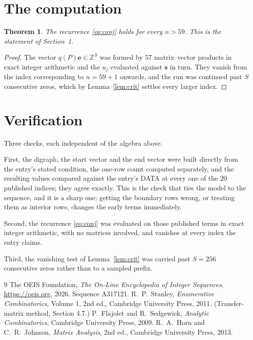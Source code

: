 \documentclass[11pt,a4paper]{article}
\theoremstyle{plain}
\newtheorem{theorem}{Theorem}
\theoremstyle{definition}
\begin{document}
\section{The computation}

\begin{theorem}
The recurrence \eqref{eq:conj} holds for every $n>59$. This is the statement of
Section~1.
\end{theorem}

\begin{proof}
The vector $q(P)\mathbf{e}\in\mathbb{Z}^{S}$ was formed by $57$ matrix--vector
products in exact integer arithmetic and the $u_j$ evaluated against $\mathbf{s}$ in turn.
They vanish from the index corresponding to $n=59+1$ onwards, and the run was continued
past $S$ consecutive zeros, which by Lemma~\ref{lem:crit} settles every larger index.
\end{proof}

\section{Verification}

Three checks, each independent of the algebra above.

First, the digraph, the start vector and the end vector were built directly from the
entry's stated condition, the one-row count computed separately, and the resulting values
compared against the entry's DATA at every one of the $20$ published indices; they
agree exactly. This is the check that ties the model to the sequence, and it is a sharp one:
getting the boundary rows wrong, or treating them as interior rows, changes the early terms
immediately.

Second, the recurrence \eqref{eq:conj} was evaluated on those published terms in exact
integer arithmetic, with no matrices involved, and vanishes at every index the entry claims.

Third, the vanishing test of Lemma~\ref{lem:crit} was carried past $S=256$ consecutive
zeros rather than to a sampled prefix.

\begin{thebibliography}{9}
 The OEIS Foundation, \emph{The On-Line Encyclopedia of Integer
Sequences}, \url{https://oeis.org}, 2026. Sequence A317121.
 R.~P.~Stanley, \emph{Enumerative Combinatorics}, Volume 1, 2nd ed.,
Cambridge University Press, 2011. (Transfer-matrix method, Section 4.7.)
 P.~Flajolet and R.~Sedgewick, \emph{Analytic Combinatorics}, Cambridge
University Press, 2009.
 R.~A.~Horn and C.~R.~Johnson, \emph{Matrix Analysis}, 2nd ed., Cambridge
University Press, 2013.
\end{thebibliography}
\end{document}
